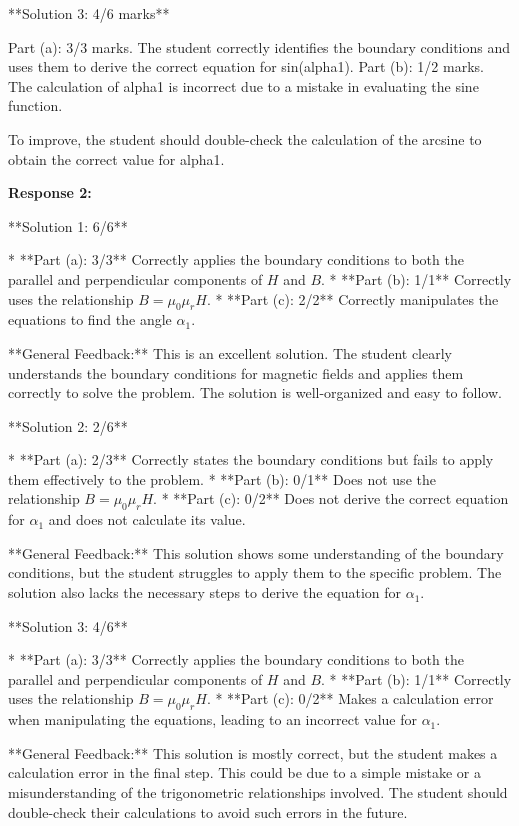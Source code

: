 \documentclass[a4paper,11pt]{article}
\begin{document}
**Solution 3: 4/6 marks**

Part (a): 3/3 marks. The student correctly identifies the boundary conditions and uses them to derive the correct equation for sin(alpha1).
Part (b): 1/2 marks. The calculation of alpha1 is incorrect due to a mistake in evaluating the sine function.

To improve, the student should double-check the calculation of the arcsine to obtain the correct value for alpha1.


\textbf{Response 2:}

**Solution 1: 6/6**

*   **Part (a): 3/3** Correctly applies the boundary conditions to both the parallel and perpendicular components of \(H\) and \(B\).
*   **Part (b): 1/1** Correctly uses the relationship \(B = \mu_0 \mu_r H\).
*   **Part (c): 2/2** Correctly manipulates the equations to find the angle \(\alpha_1\).

**General Feedback:** This is an excellent solution. The student clearly understands the boundary conditions for magnetic fields and applies them correctly to solve the problem. The solution is well-organized and easy to follow.

**Solution 2: 2/6**

*   **Part (a): 2/3** Correctly states the boundary conditions but fails to apply them effectively to the problem.
*   **Part (b): 0/1** Does not use the relationship \(B = \mu_0 \mu_r H\).
*   **Part (c): 0/2** Does not derive the correct equation for \(\alpha_1\) and does not calculate its value.

**General Feedback:** This solution shows some understanding of the boundary conditions, but the student struggles to apply them to the specific problem. The solution also lacks the necessary steps to derive the equation for \(\alpha_1\).

**Solution 3: 4/6**

*   **Part (a): 3/3** Correctly applies the boundary conditions to both the parallel and perpendicular components of \(H\) and \(B\).
*   **Part (b): 1/1** Correctly uses the relationship \(B = \mu_0 \mu_r H\).
*   **Part (c): 0/2** Makes a calculation error when manipulating the equations, leading to an incorrect value for \(\alpha_1\).

**General Feedback:** This solution is mostly correct, but the student makes a calculation error in the final step. This could be due to a simple mistake or a misunderstanding of the trigonometric relationships involved. The student should double-check their calculations to avoid such errors in the future.
\end{document}
